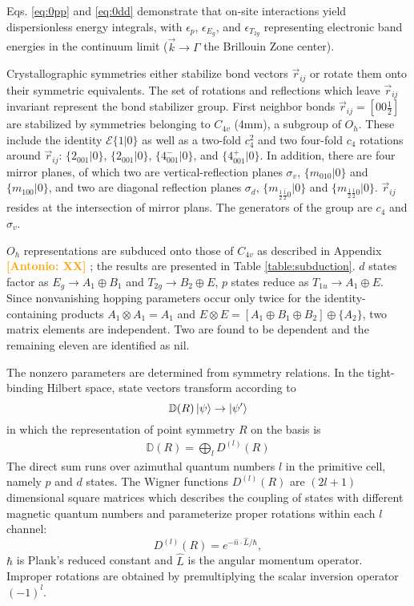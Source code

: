 \documentclass[twocolumn,showpacs,preprintnumbers,superscriptaddress,prb,floatfix,aps,10pt]{revtex4-1}
\newcommand{\abmei}[1]{\textcolor{orange}{ \bf [Antonio: #1] }}
\newcommand*{\wignerD}{\mathbb{D}(R)}
\newcommand*{\wignerDl}{D^{(l)}(R)}
\newcommand*{\id}{\mathcal{E}}
\newcommand*{\bondvec}{\vec{r}_{ij}}
\newcommand{\seitz}[2]{\{#1|#2\}}
\begin{document}
%
Eqs. \ref{eq:0pp} and \ref{eq:0dd} demonstrate that on-site interactions yield dispersionless energy integrals, with $\epsilon_p$, $\epsilon_{E_g}$, and $\epsilon_{T_{2g}}$ representing electronic band energies in the continuum limit ($\vec{k} \rightarrow \Gamma$ the Brillouin Zone center).

Crystallographic symmetries either stabilize bond vectors $\bondvec$ or rotate them onto their symmetric equivalents. The set of rotations and reflections which leave $\bondvec$ invariant represent the bond stabilizer group. First neighbor bonds $\bondvec = [00\frac{1}{2}]$ are stabilized by symmetries belonging to $C_{4v}$ (4mm), a subgroup of $O_h$. These include the identity $\id \seitz{1}{0}$ as well as a two-fold $c_{4}^2$ and two four-fold $c_{4}$ rotations around $\bondvec$: $\seitz{2_{001}}{0}$, $\seitz{2_{001}}{0}$, $\seitz{4^-_{001}}{0}$, and $\seitz{4^+_{001}}{0}$. In addition, there are four mirror planes, of which two are vertical-reflection planes $\sigma_v$, $\seitz{m_{010}}{0}$ and $\seitz{m_{100}}{0}$, and two are diagonal reflection planes $\sigma_d$, $\seitz{m_{\frac{1}{2}\bar{\frac{1}{2}}0}}{0}$ and $\seitz{m_{\frac{1}{2}\frac{1}{2}0}}{0}$. $\bondvec$ resides at the intersection of mirror plans. The generators of the group are $c_4$ and $\sigma_v$. 

$O_h$ representations are subduced onto those of $C_{4v}$ as described in Appendix \abmei{XX}; the results are presented in Table \ref{table:subduction}. $d$ states factor as $E_g \rightarrow A_1 \oplus B_1$ and $T_{2g} \rightarrow B_2 \oplus E$, $p$ states reduce as $T_{1u} \rightarrow A_1 \oplus E$. Since nonvanishing hopping parameters occur only twice for the identity-containing products $A_1 \otimes A_1 = A_1$ and $E \otimes E = [ A_1 \oplus B_1 \oplus B_2 ] \oplus \{ A_2 \}$, two matrix elements are independent. Two are found to be dependent and the remaining eleven are identified as nil. 

The nonzero parameters are determined from symmetry relations. In the tight-binding Hilbert space, state vectors transform according to 
%
\begin{equation}
\label{eq:transformation}
\wignerD \ket{\psi} \rightarrow \ket{\psi'}
\end{equation}
%
in which the representation of point symmetry $R$ on the basis is
%
\begin{align}
\wignerD = \bigoplus_l \wignerDl
\end{align}
%
The direct sum runs over azimuthal quantum numbers $l$ in the primitive cell, namely $p$ and $d$ states. The Wigner functions $\wignerDl$ are $(2l+1)$ dimensional square matrices which describes the coupling of states with different magnetic quantum numbers and parameterize proper rotations within each $l$ channel:
\begin{equation}
\wignerDl = e^{- \hat{n} \cdot \hat{L} /\hbar},
\end{equation}
%
$\hbar$ is Plank's reduced constant and $\hat{L}$ is the angular momentum operator. Improper rotations are obtained by premultiplying the scalar inversion operator $(-1)^l$. \cite{sharma_general_1979,el-batanouny_symmetry_2008} 
\end{document}
